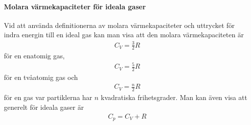 \paragraph{Molara värmekapaciteter för ideala gaser}
Vid att använda definitionerna av molara värmekapaciteter och uttrycket för indra energin till en ideal gas kan man visa att den molara värmekapaciteten är
\begin{align*}
	C_V = \frac{3}{2}R
\end{align*}
för en enatomig gas,
\begin{align*}
	C_V = \frac{5}{2}R
\end{align*}
för en tvåatomig gas och
\begin{align*}
	C_V = \frac{n}{2}R
\end{align*}
för en gas var partiklerna har $n$ kvadratiska frihetsgrader. Man kan även visa att generelt för ideala gaser är
\begin{align*}
	C_p = C_V + R
\end{align*}
